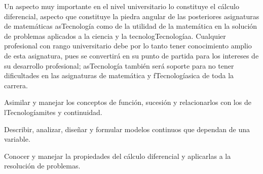 \begin{syllabus}


\begin{justification}
Un aspecto muy importante en el nivel universitario lo constituye el cálculo diferencial,  aspecto que constituye la piedra angular de las posteriores asignaturas de matemáticas asTecnología como de la utilidad de la matemática en la solución de problemas aplicados a la ciencia y la tecnologTecnologíaa. Cualquier profesional con rango universitario debe por lo tanto tener conocimiento amplio de esta asignatura, pues se convertirá en su punto de partida para los intereses de su desarrollo profesional; asTecnología también será soporte para no tener dificultades en las asignaturas de matemática y fTecnologíasica de toda la carrera.
\end{justification}

\begin{goals}
\item Asimilar y manejar los conceptos de función, sucesión y relacionarlos con los de lTecnologíamites y continuidad.
\item Describir, analizar, diseñar y formular modelos continuos que dependan de una variable.
\item Conocer y manejar la propiedades del cálculo diferencial y aplicarlas a la resolución de problemas.
\end{goals}

\begin{outcomes}
    \item {}
    \item {}
\end{outcomes}

\begin{competences}
    \item {}
    \item {}
    \item {}
\end{competences}


\end{syllabus}
